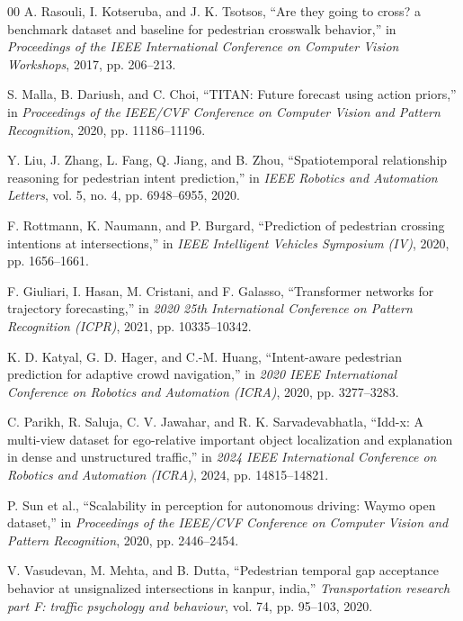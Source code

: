 \documentclass[12pt, a4paper]{article}
\begin{document}
\begin{thebibliography}{00}
A. Rasouli, I. Kotseruba, and J. K. Tsotsos, ``Are they going to cross? a benchmark dataset and baseline for pedestrian crosswalk behavior,'' in \textit{Proceedings of the IEEE International Conference on Computer Vision Workshops}, 2017, pp. 206–213.

S. Malla, B. Dariush, and C. Choi, ``TITAN: Future forecast using action priors,'' in \textit{Proceedings of the IEEE/CVF Conference on Computer Vision and Pattern Recognition}, 2020, pp. 11186–11196.

Y. Liu, J. Zhang, L. Fang, Q. Jiang, and B. Zhou, ``Spatiotemporal relationship reasoning for pedestrian intent prediction,'' in \textit{IEEE Robotics and Automation Letters}, vol. 5, no. 4, pp. 6948--6955, 2020.

F. Rottmann, K. Naumann, and P. Burgard, ``Prediction of pedestrian crossing intentions at intersections,'' in \textit{IEEE Intelligent Vehicles Symposium (IV)}, 2020, pp. 1656--1661.

F. Giuliari, I. Hasan, M. Cristani, and F. Galasso, ``Transformer networks for trajectory forecasting,'' in \textit{2020 25th International Conference on Pattern Recognition (ICPR)}, 2021, pp. 10335--10342.

K. D. Katyal, G. D. Hager, and C.-M. Huang, ``Intent-aware pedestrian prediction for adaptive crowd navigation,'' in \textit{2020 IEEE International Conference on Robotics and Automation (ICRA)}, 2020, pp. 3277–3283.

C. Parikh, R. Saluja, C. V. Jawahar, and R. K. Sarvadevabhatla, ``Idd-x: A multi-view dataset for ego-relative important object localization and explanation in dense and unstructured traffic,'' in \textit{2024 IEEE International Conference on Robotics and Automation (ICRA)}, 2024, pp. 14815–14821.

P. Sun et al., ``Scalability in perception for autonomous driving: Waymo open dataset,'' in \textit{Proceedings of the IEEE/CVF Conference on Computer Vision and Pattern Recognition}, 2020, pp. 2446–2454.

V. Vasudevan, M. Mehta, and B. Dutta, ``Pedestrian temporal gap acceptance behavior at unsignalized intersections in kanpur, india,'' \textit{Transportation research part F: traffic psychology and behaviour}, vol. 74, pp. 95–103, 2020.


\end{thebibliography}
\end{document}
